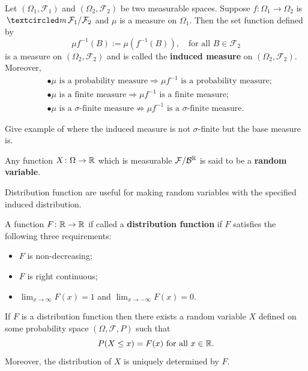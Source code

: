 \begin{theorem}
Let $(\Omega_1, \mathcal F_1)$ and $(\Omega_2,\mathcal F_2)$ be two measurable spaces. Suppose $f:\Omega_1\rightarrow \Omega_2$ is $\mcirc \mathcal F_1/\mathcal F_2$ and $\mu$ is a measure on $\Omega_1$. Then the set function defined by
\[ \mu f^{-1}(B):=\mu(f^{-1}(B)),\quad\text{for all $B\in\mathcal F_2$}\]
 is a measure on $(\Omega_2,\mathcal F_2)$ and is called the {\bf induced measure} on $(\Omega_2,\mathcal F_2)$. Moreover,
 \begin{align*}
 &\bullet\text{$\mu$ is a probability measure} \Longrightarrow  \text{$\mu f^{-1}$ is a probability measure;}\\
 &\bullet\text{$\mu$ is a finite measure} \Longrightarrow  \text{$\mu f^{-1}$ is a finite measure;} \\
 &\bullet\text{$\mu$ is a $\sigma$-finite measure} \not\Longrightarrow  \text{$\mu f^{-1}$ is a $\sigma$-finite measure.}
 \end{align*}
\end{theorem}


Give example of where the induced measure is not $\sigma$-finite but the base measure is.



\begin{definition}
Any function $X\colon \Omega \rightarrow \Bbb R$ which is measurable $\mathcal F/\mathcal B^{\Bbb R}$  is said to be a {\bf random variable}.
\end{definition}

Distribution function are useful for making random variables with the specified induced distribution.

\begin{definition}
A function $F\colon\Bbb R\rightarrow\Bbb R$ if called a {\bf distribution function} if $F$ satisfies the following three requirements:
\begin{itemize}
\item $F$ is non-decreasing;
\item $F$ is right continuous;
\item $\lim_{x\rightarrow \infty} F(x)=1$ and $\lim_{x\rightarrow -\infty} F(x)=0$.
\end{itemize}
\end{definition}


\begin{theorem}[{\bf Df's determine $PX^{-1}$}]
If $F$ is a distribution function then there exists a random variable $X$ defined on some probability space $(\Omega, \mathcal F, P)$ such that
\[ P(X\leq x) = F(x)\text{ for all $x\in\Bbb R$}. \]
Moreover, the distribution of $X$ is uniquely determined by $F$.
\end{theorem}


